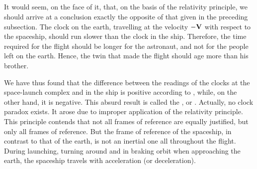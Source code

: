 \subsection{}\label{5.4.7} It would seem, on the face of it, that, on the basis of the relativity principle, we should arrive at a conclusion exactly the opposite of that given in the preceding subsection. The clock on the earth, travelling at the velocity $-\vb{V}$ with respect to the spaceship, should run slower than the clock in the ship. There­fore, the time required for the flight should be longer for the astronaut, and not for the people left on the earth. Hence, the twin that made the flight should age more than his brother.

We have thus found that the difference between the readings of the clocks at the space-launch complex and in the ship is positive according to , while, on the other hand, it is negative. This absurd result is called the , or . Actually, no clock paradox exists. It arose due to improper application of the relativity principle. This principle contends that not all frames of reference are equally justified, but only all  frames of reference. But the frame of reference of the spaceship, in contrast to that of the earth, is not an inertial one all throughout the flight. During launching, turning around and in braking orbit when approaching the earth, the spaceship travels with acceleration (or deceleration). 

